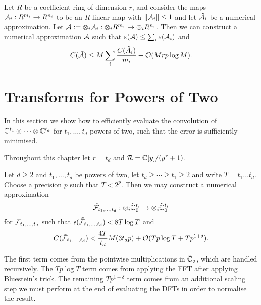 \begin{lemma}\label{lem:tensor-products}
    Let $R$ be a coefficient ring of dimension $r$, and consider the maps $\mathcal A_i : R^{m_i} \to R^{n_i}$ to be an $R$-linear map with $\|\mathcal A_i\| \le 1$ and let $\tilde{\mathcal A_i}$ be a numerical approximation. Let $\mathcal A := \otimes_i \mathcal A_i : \otimes_i R^{m_i} \to \otimes_i R^{n_i}$. Then we can construct a numerical approximation $\tilde{\mathcal A}$ such that $\varepsilon(\tilde{\mathcal A}) \le \sum_i \varepsilon(\tilde{\mathcal A}_i)$ and
    \[
        C(\tilde{\mathcal A}) \le M \sum_i\frac{C(\tilde{A}_i)}{m_i} + \mathcal O(Mrp \log M).
    \]
\end{lemma}


\section{Transforms for Powers of Two}
\label{sec:transfoms-for-powers-of-two}

In this section we show how to efficiently evaluate the convolution of ${\mathbb C}^{t_1} \otimes \cdots \otimes {\mathbb C}^{t_d}$ for $t_1, \ldots, t_d$ powers of two, such that the error is sufficiently minimised.

Throughout this chapter let $r = t_d$ and $\mathcal R = {\mathbb C}[y] / (y^r + 1)$.

\begin{theorem}\label{thm:main-3}
    Let $d \geq 2$ and $t_1, \ldots, t_d$ be powers of two, let $t_d \geq \cdots \geq t_1 \geq 2$ and write $T = t_1 \ldots t_d$. Choose a precision $p$ such that $T < 2^p$. Then we may construct a numerical approximation
    \[
        \tilde {\mathcal F}_{t_1, \ldots, t_d} : \otimes_i \tilde{{\mathbb C}}^{t_i}_0 \to \otimes_i \tilde{{\mathbb C}}^{t_i}_0
    \]
    for $\mathcal F_{t_1, \ldots, t_d}$ such that $\epsilon(\tilde{\mathcal F}_{t_1, \ldots, t_d}) < 8 T \log T$ and
    \[
        C(\tilde{\mathcal F}_{t_1, \ldots, t_d}) < \frac{4T}{t_d} M(3t_d p) + \mathcal O(Tp\log T + Tp^{1 + \delta}).
    \]
\end{theorem}

The first term comes from the pointwise multiplications in $\tilde{{\mathbb C}}_\circ$, which are handled recursively. The $Tp \log T$ term comes from applying the FFT after applying Bluestein's trick. The remaining $Tp^{1 + \delta}$ term comes from an additional scaling step we must perform at the end of evaluating the DFTs in order to normalise the result.

